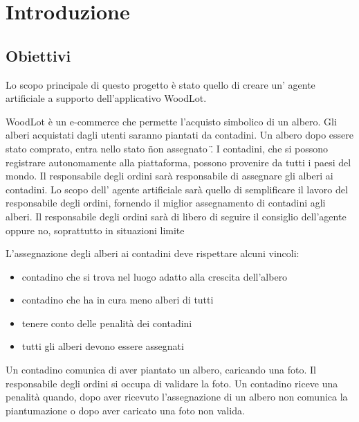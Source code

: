 \chapter{Introduzione}

\section{Obiettivi} %
Lo scopo principale di questo progetto è stato quello di creare un' agente artificiale a supporto dell'applicativo WoodLot.

WoodLot è un e-commerce che permette l'acquisto simbolico di un albero. Gli alberi acquistati dagli utenti saranno piantati da contadini. Un albero dopo essere stato comprato, entra nello stato \"non assegnato \" . I contadini, che si possono registrare autonomamente alla piattaforma, possono provenire da tutti i paesi del mondo.
Il responsabile degli ordini sarà responsabile di assegnare gli alberi ai contadini. Lo scopo dell' agente artificiale sarà quello di semplificare  il lavoro del responsabile degli ordini, fornendo il miglior assegnamento di contadini agli alberi. Il responsabile degli ordini sarà di libero di seguire il consiglio dell'agente oppure no, soprattutto in situazioni limite 

L'assegnazione degli alberi ai contadini deve rispettare alcuni vincoli: 
\begin{itemize}
\item contadino che si trova nel luogo adatto alla crescita dell'albero
\item contadino che ha in cura meno alberi di tutti 
\item tenere conto delle penalità dei contadini
\item tutti gli alberi devono essere assegnati 
\end{itemize}
Un contadino comunica di aver piantato un albero, caricando una foto. Il responsabile degli ordini si occupa di validare la foto. 
Un contadino riceve una penalità quando, dopo aver ricevuto l'assegnazione di un albero non comunica la piantumazione o dopo aver caricato una foto non valida. 



